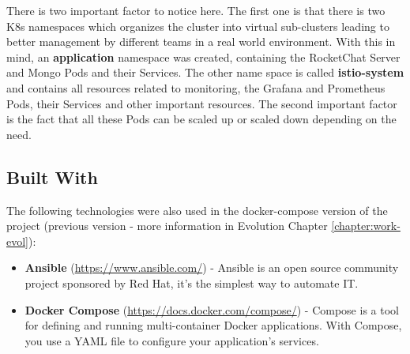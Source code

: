 \documentclass[12pt,a4paper,oneside]{report}
\begin{document}
There is two important factor to notice here. The first one is that there is two \ac{K8s} namespaces which organizes the cluster into virtual sub-clusters leading to better management by different teams in a real world environment. With this in mind, an \textbf{application} namespace was created, containing the RocketChat Server and Mongo Pods and their Services. The other name space is called \textbf{istio-system} and contains all resources related to monitoring, the Grafana and Prometheus Pods, their Services and other important resources. The second important factor is the fact that all these Pods can be scaled up or scaled down depending on the need.

\subsection{Built With}
\label{section:built-with}

The following technologies were also used in the docker-compose version of the project (previous version - more information in Evolution Chapter \ref{chapter:work-evol}):
\begin{itemize}
    \item \textbf{Ansible} (\url{https://www.ansible.com/}) - Ansible is an open source community project sponsored by Red Hat, it's the simplest way to automate IT.
    \item \textbf{Docker Compose} (\url{https://docs.docker.com/compose/}) - Compose is a tool for defining and running multi-container Docker applications. With Compose, you use a YAML file to configure your application's services.
\end{itemize}
\end{document}
